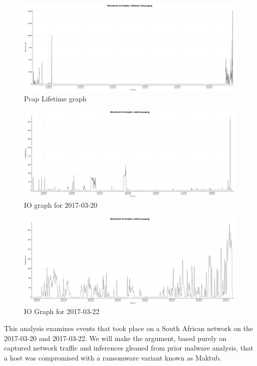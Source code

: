 \documentclass[11pt]{diazessay} %
\begin{document}
\begin{figure}[H]
        \centering
        \includegraphics[scale=0.30]{Maktub_Full.png}
    \caption{Pcap Lifetime graph}
\end{figure}

\begin{figure}[H]
        \centering
        \includegraphics[scale=0.30]{mak20.png}
    \caption{IO graph for 2017-03-20} 
\end{figure}

\begin{figure}[H]
        \centering
        \includegraphics[scale=0.30]{mak22.png}
    \caption{IO Graph for 2017-03-22}
\end{figure}

This analysis examines events that took place on a South African network on the 2017-03-20 and 2017-03-22. We will make the argument, based purely on captured network traffic and inferences gleaned from prior malware analysis, that a host was compromised with a ransomware variant known as Maktub. 
\end{document}
